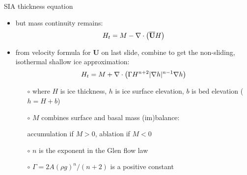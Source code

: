 \begin{frame}{SIA thickness equation}

\begin{itemize}
\item but mass continuity remains:
  $$H_t = M - \nabla\cdot \left(\overline{\mathbf{U}} H\right)$$
\item from velocity formula for $\mathbf{U}$ on last slide, combine to get the non-sliding, isothermal shallow ice approximation:
\begin{equation}
H_t = M + \nabla\cdot \left(\Gamma H^{n+2} |\nabla h|^{n-1} \nabla h \right) \notag
\end{equation}

  \begin{itemize}
  \item[$\circ$] where $H$ is ice thickness, $h$ is ice surface elevation, $b$ is bed elevation ($h=H+b$)
  \item[$\circ$] $M$ combines surface and basal mass (im)balance:

     accumulation if $M>0$, ablation if $M<0$
  \item[$\circ$] $n$ is the exponent in the Glen flow law
  \item[$\circ$] $\Gamma = 2 A (\rho g)^n / (n+2)$ is a positive constant
  \end{itemize}
\end{itemize}
\end{frame}


